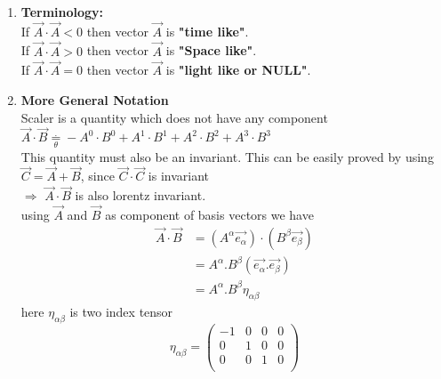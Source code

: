 \documentclass[11pt,a4paper]{article}
\begin{document}
\begin{enumerate}
\begin{enumerate}
\begin{enumerate}
                        \item \textbf{Terminology:}\\
                              If $\vec{A}\cdot\vec{A} < 0$ then vector $\vec{A}$ is \textbf{"time like"}.\\
                              If $\vec{A}\cdot\vec{A} > 0$ then vector $\vec{A}$ is \textbf{"Space like"}.\\
                              If $\vec{A}\cdot\vec{A} = 0$ then vector $\vec{A}$ is \textbf{"light like or NULL"}.\\
                        \item \textbf{More General Notation}\\
                              Scaler is a quantity which does not have any component\\
                              $\vec{A}\cdot\vec{B} \mathop = \limits^{.}_{\theta} - A^0\cdot B^0 + A^1\cdot B^1 + A^2\cdot B^2 + A^3\cdot B^3$\\
                              This quantity must also be an invariant. This can be easily proved by using $\vec{C}=\vec{A}+\vec{B}$, since $\vec{C}\cdot\vec{C}$ is invariant\\
                              $\Rightarrow$ $ \vec{A}\cdot\vec{B}$ is also lorentz invariant.\\
                              using $\vec{A}$ and $\vec{B}$ as component of basis vectors we have
                              \begin{align*}
                                  \vec{A}\cdot\vec{B} & = (A^{\alpha}\vec{e_{\alpha}})\cdot(B^{\beta}\vec{e_{\beta}}) \\
                                                      & = A^{\alpha}.B^{\beta} (\vec{e_{\alpha}}.\vec{e_{\beta}})     \\
                                                      & = A^{\alpha}.B^{\beta} {\displaystyle{\eta_{\alpha\beta}}}
                              \end{align*}
                              here ${\displaystyle{\eta_{\alpha\beta}}}$ is two index tensor
                              \[ {\displaystyle{\eta_{\alpha\beta}}} = \begin{pmatrix}
                                      -1 & 0 & 0 & 0 \\
                                      0  & 1 & 0 & 0 \\
                                      0  & 0 & 1 & 0 \\

\end{pmatrix}\]
\end{enumerate}
\end{enumerate}
\end{enumerate}
\end{document}
